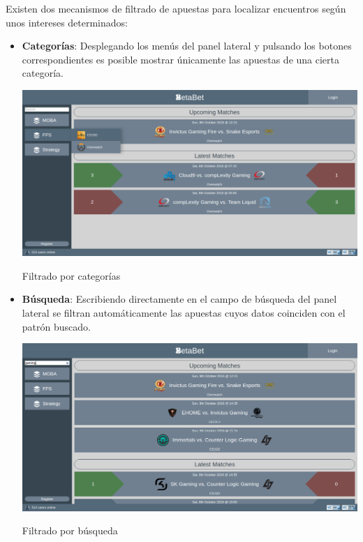 \documentclass{article}
\begin{document}
\newpage
Existen dos mecanismos de filtrado de apuestas para localizar encuentros según unos intereses determinados:
\begin{itemize}
    \item\textbf{Categorías}: Desplegando los menús del panel lateral y pulsando los botones correspondientes es posible mostrar únicamente las apuestas de una cierta categoría.
        \smallskip\newline
        \begin{minipage}{\linewidth}
            \centering
            \captionsetup{type=figure}
            \includegraphics[width=\linewidth]{fig3}
            \caption{Filtrado por categorías}
            \label{fig:fig3}
        \end{minipage}
    \item\textbf{Búsqueda}: Escribiendo directamente en el campo de búsqueda del panel lateral se filtran automáticamente las apuestas cuyos datos coinciden con el patrón buscado.
        \smallskip\newline
        \begin{minipage}{\linewidth}
            \centering
            \captionsetup{type=figure}
            \includegraphics[width=\linewidth]{fig4}
            \caption{Filtrado por búsqueda}
            \label{fig:fig4}
        \end{minipage}
\end{itemize}
\newpage
\end{document}

